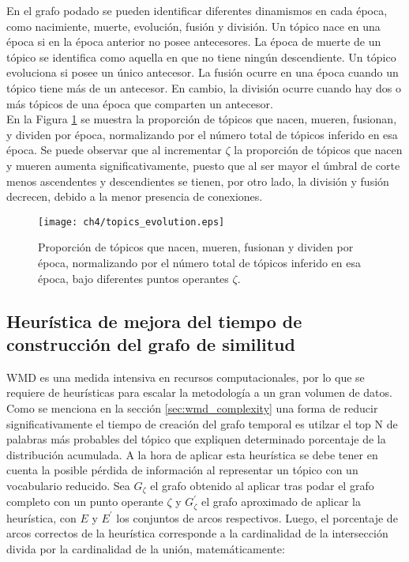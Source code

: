 En el grafo podado se pueden identificar diferentes dinamismos en cada época, como nacimiente, muerte, evolución, fusión y división. Un tópico nace en una época si en la época anterior no posee antecesores. La época de muerte de un tópico se identifica como aquella en que no tiene ningún descendiente. Un tópico evoluciona si posee un único antecesor. La fusión ocurre en una época cuando un tópico tiene más de un antecesor. En cambio, la división ocurre cuando hay dos o más tópicos de una época que comparten un antecesor.\\

En la Figura \ref{img:topics_evolution} se muestra la proporción de tópicos que nacen, mueren, fusionan, y dividen por época, normalizando por el número total de tópicos inferido en esa época. Se puede observar que al incrementar $\zeta$ la proporción de tópicos que nacen y mueren aumenta significativamente, puesto que al ser mayor el úmbral de corte menos ascendentes y descendientes se tienen, por otro lado, la división y fusión decrecen, debido a la menor presencia de conexiones.

\begin{figure}
    \centering
    \texttt{[image: ch4/topics\_evolution.eps]}
    \caption{Proporción de tópicos que nacen, mueren, fusionan y dividen por época, normalizando por el número total de tópicos inferido en esa época, bajo diferentes puntos operantes $\zeta$.}
    \label{img:topics_evolution}
\end{figure}



\subsection{Heurística de mejora del tiempo de construcción del grafo de similitud}

WMD es una medida intensiva en recursos computacionales, por lo que se requiere de heurísticas para escalar la metodología a un gran volumen de datos. Como se menciona en la sección \ref{sec:wmd_complexity} una forma de reducir significativamente el tiempo de creación del grafo temporal es utilzar el top N de palabras más probables del tópico que expliquen determinado porcentaje de la distribución acumulada. A la hora de aplicar esta heurística se debe tener en cuenta la posible pérdida de información al representar un tópico con un vocabulario reducido. Sea $G_{\zeta}$ el grafo obtenido al aplicar tras podar el grafo completo con un punto operante $\zeta$ y $G^{'}_{\zeta}$ el grafo aproximado de aplicar la heurística, con $E$ y $E^{'}$ los conjuntos de arcos respectivos. Luego, el porcentaje de arcos correctos de la heurística corresponde a la cardinalidad de la intersección divida por la cardinalidad de la unión, matemáticamente:

